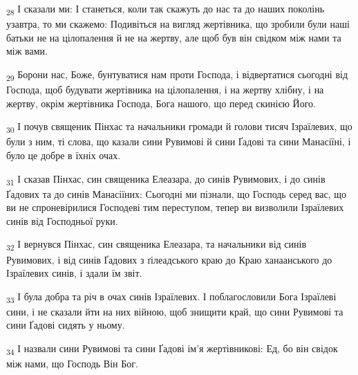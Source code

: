 \begin{tcolorbox}
\textsubscript{28} І сказали ми: І станеться, коли так скажуть до нас та до наших поколінь узавтра, то ми скажемо: Подивіться на вигляд жертівника, що зробили були наші батьки не на цілопалення й не на жертву, але щоб був він свідком між нами та між вами.
\end{tcolorbox}
\begin{tcolorbox}
\textsubscript{29} Борони нас, Боже, бунтуватися нам проти Господа, і відвертатися сьогодні від Господа, щоб будувати жертівника на цілопалення, і на жертву хлібну, і на жертву, окрім жертівника Господа, Бога нашого, що перед скинією Його.
\end{tcolorbox}
\begin{tcolorbox}
\textsubscript{30} І почув священик Пінхас та начальники громади й голови тисяч Ізраїлевих, що були з ним, ті слова, що казали сини Рувимові й сини Ґадові та сини Манасіїні, і було це добре в їхніх очах.
\end{tcolorbox}
\begin{tcolorbox}
\textsubscript{31} І сказав Пінхас, син священика Елеазара, до синів Рувимових, і до синів Ґадових та до синів Манасіїних: Сьогодні ми пізнали, що Господь серед вас, що ви не спроневірилися Господеві тим переступом, тепер ви визволили Ізраїлевих синів від Господньої руки.
\end{tcolorbox}
\begin{tcolorbox}
\textsubscript{32} І вернувся Пінхас, син священика Елеазара, та начальники від синів Рувимових, і від синів Ґадових з ґілеадського краю до Краю ханаанського до Ізраїлевих синів, і здали їм звіт.
\end{tcolorbox}
\begin{tcolorbox}
\textsubscript{33} І була добра та річ в очах синів Ізраїлевих. І поблагословили Бога Ізраїлеві сини, і не сказали йти на них війною, щоб знищити край, що сини Рувимові та сини Ґадові сидять у ньому.
\end{tcolorbox}
\begin{tcolorbox}
\textsubscript{34} І назвали сини Рувимові та сини Ґадові ім'я жертівникові: Ед, бо він свідок між нами, що Господь Він Бог.
\end{tcolorbox}
